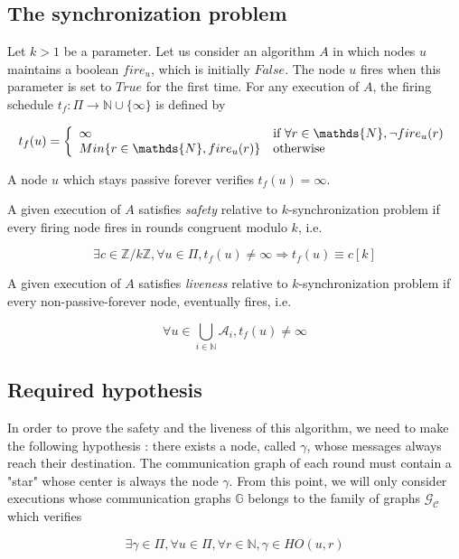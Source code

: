 \documentclass{article}
\newcommand{\cent}{\gamma}
\newcommand{\tf}{t_{f}}
\begin{document}
\subsection{The synchronization problem}

	Let $k > 1$ be a parameter. Let us consider an algorithm $A$ in which nodes $u$ maintains a boolean $fire_u$, which is initially $False$.
	The node $u$ fires when this parameter is set to $True$ for the first time.
	For any execution of $A$, the firing schedule $\tf : \Pi \rightarrow \mathds{N} \cup \{\infty\}$ is defined by 

	$$\tf(u) = \left \{
	\begin{array}{l l}
		\infty & \mbox{if}~\forall r \in \mathds{N}, \neg fire_u(r) \\
		Min \{r \in \mathds{N}, fire_u(r)\} & \mbox{otherwise}
	\end{array} \right.$$

	 A node $u$ which stays passive forever verifies $\tf(u) = \infty$.

	A given execution of $A$ satisfies \textit{safety} relative to $k$-synchronization problem if every firing node fires in rounds congruent modulo $k$, i.e.

	$$\exists c \in \mathds{Z}/k\mathds{Z}, \forall u \in \Pi, \tf(u) \neq \infty \Rightarrow \tf(u) \equiv c[k]$$

	A given execution of $A$ satisfies \textit{liveness} relative to $k$-synchronization problem if every non-passive-forever node, eventually fires, i.e.

	$$\forall u \in \bigcup\limits_{i \in \mathds{N}} \mathcal{A}_i, \tf(u) \neq \infty$$

\subsection{Required hypothesis}

In order to prove the safety and the liveness of this algorithm, we need to make the following hypothesis :
there exists a node, called $\cent$, whose messages always reach their destination.
The communication graph of each round must contain a "star" whose center is always the node $\cent$.
From this point, we will only consider executions whose communication graphs $\mathds{G}$ belongs to the family of graphs $\mathcal{G}_\mathcal{C}$ which verifies

$$\exists \cent \in \Pi, \forall u \in \Pi, \forall r \in \mathds{N}, \cent \in HO(u,r)$$
\end{document}

